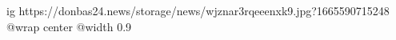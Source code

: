  
 
 
 
 

\ifcmt
  ig https://donbas24.news/storage/news/wjznar3rqeeenxk9.jpg?1665590715248
  @wrap center
  @width 0.9
\fi
